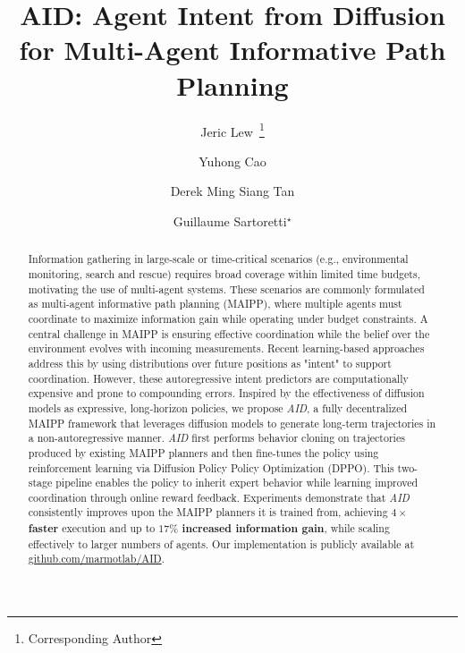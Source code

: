 \documentclass[runningheads]{llncs}
\begin{document}
\title{AID: Agent Intent from Diffusion for Multi-Agent Informative Path Planning}
\author{
Jeric Lew~\thanks{Corresponding Author} \and Yuhong Cao \and
Derek Ming Siang Tan \and
Guillaume Sartoretti$^{\star}$
}


\maketitle

\begin{abstract}
Information gathering in large-scale or time-critical scenarios (e.g., environmental monitoring, search and rescue) requires broad coverage within limited time budgets, motivating the use of multi-agent systems.
These scenarios are commonly formulated as multi-agent informative path planning (MAIPP), where multiple agents must coordinate to maximize information gain while operating under budget constraints.
A central challenge in MAIPP is ensuring effective coordination while the belief over the environment evolves with incoming measurements.
Recent learning-based approaches address this by using distributions over future positions as "intent" to support coordination.
However, these autoregressive intent predictors are computationally expensive and prone to compounding errors.
Inspired by the effectiveness of diffusion models as expressive, long-horizon policies, we propose \textit{AID}, a fully decentralized MAIPP framework that leverages diffusion models to generate long-term trajectories in a non-autoregressive manner. \textit{AID} first performs behavior cloning on trajectories produced by existing MAIPP planners and then fine-tunes the policy using reinforcement learning via Diffusion Policy Policy Optimization (DPPO). This two-stage pipeline enables the policy to inherit expert behavior while learning improved coordination through online reward feedback.
Experiments demonstrate that \textit{AID} consistently improves upon the MAIPP planners it is trained from, achieving \textbf{\boldmath $4\times$ faster} execution and up to \textbf{\boldmath $17\%$ increased information gain}, while scaling effectively to larger numbers of agents. Our implementation is publicly available at \href{https://github.com/marmotlab/AID}{github.com/marmotlab/AID}.

\end{abstract}
\end{document}
